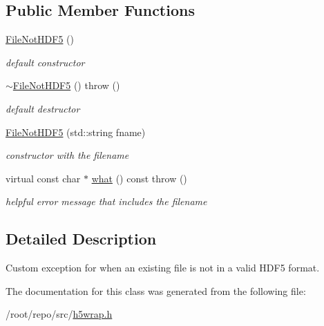 \subsection*{Public Member Functions}
\begin{DoxyCompactItemize}
\item 
\mbox{\label{classh5wrap_1_1_file_not_h_d_f5_a3fa40cb39abaa241e80ee97a13e69815}} 
\hyperlink{classh5wrap_1_1_file_not_h_d_f5_a3fa40cb39abaa241e80ee97a13e69815}{File\+Not\+H\+D\+F5} ()
\begin{DoxyCompactList}\small\item\em default constructor \end{DoxyCompactList}\item 
\mbox{\label{classh5wrap_1_1_file_not_h_d_f5_a55276b2bc97da82f25a0718327b00742}} 
\hyperlink{classh5wrap_1_1_file_not_h_d_f5_a55276b2bc97da82f25a0718327b00742}{$\sim$\+File\+Not\+H\+D\+F5} ()  throw ()
\begin{DoxyCompactList}\small\item\em default destructor \end{DoxyCompactList}\item 
\mbox{\label{classh5wrap_1_1_file_not_h_d_f5_ac6f9e6588f3a55f26fe6cd13ab75425b}} 
\hyperlink{classh5wrap_1_1_file_not_h_d_f5_ac6f9e6588f3a55f26fe6cd13ab75425b}{File\+Not\+H\+D\+F5} (std\+::string fname)
\begin{DoxyCompactList}\small\item\em constructor with the filename \end{DoxyCompactList}\item 
\mbox{\label{classh5wrap_1_1_file_not_h_d_f5_a14843e8c0d01e17f5335ca53f1198aef}} 
virtual const char $\ast$ \hyperlink{classh5wrap_1_1_file_not_h_d_f5_a14843e8c0d01e17f5335ca53f1198aef}{what} () const  throw ()
\begin{DoxyCompactList}\small\item\em helpful error message that includes the filename \end{DoxyCompactList}\end{DoxyCompactItemize}


\subsection{Detailed Description}
Custom exception for when an existing file is not in a valid H\+D\+F5 format. 

The documentation for this class was generated from the following file\+:\begin{DoxyCompactItemize}
\item 
/root/repo/src/\hyperlink{h5wrap_8h}{h5wrap.\+h}\end{DoxyCompactItemize}
